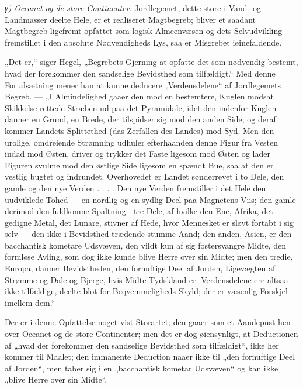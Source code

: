 \documentclass[12pt,a4paper]{book}
\newcommand{\subrunin}[1]{\emph{#1}\hspace{0.4em}}
\begin{document}
\subrunin{γ) Oceanet og de store Continenter.} Jordlegemet, dette store i
Vand- og Landmasser deelte Hele, er et realiseret Magtbegreb; bliver et
saadant Magtbegreb ligefremt opfattet som logisk Almeenvæsen og dets
Selvudvikling fremstillet i den absolute Nødvendigheds Lys, saa er
Misgrebet iøinefaldende.

„Det er,“ siger Hegel, „Begrebets Gjerning at opfatte det som nødvendig
bestemt, hvad der forekommer den sandselige Bevidsthed som tilfældigt.“
Med denne Forudsætning mener han at kunne deducere „Verdensdelene“ af
Jordlegemets Begreb. --- „I Almindelighed gaaer den mod en bestemtere,
Kuglen modsat Skikkelse rettede Stræben ud paa det Pyramidale, idet den
indenfor Kuglen danner en Grund, en Brede, der tilspidser sig mod den
anden Side; og deraf kommer Landets Splittethed (das Zerfallen des Landes)
mod Syd. Men den urolige, omdreiende Strømning udhuler efterhaanden denne
Figur fra Vesten indad mod Østen, driver og trykker det Faste ligesom mod
Østen og lader Figuren svulme mod den østlige Side ligesom en spændt Bue,
saa at den er vestlig bugtet og indrundet. Overhovedet er Landet
sønderrevet i to Dele, den gamle og den nye Verden . . . . Den nye Verden
fremstiller i det Hele den uudviklede Tohed --- en nordlig og en sydlig
Deel paa Magnetens Viis; den gamle derimod den fuldkomne Spaltning i tre
Dele, af hvilke den Ene, Afrika, det gedigne Metal, det Lunare, stivner af
Hede, hvor Mennesket er sløvt fortabt i sig selv --- den ikke i Bevidsthed
trædende stumme Aand; den anden, Asien, er den bacchantisk kometare
Udsvæven, den vildt kun af sig
fostersvangre Midte, den formløse Avling, som dog ikke kunde blive Herre
over sin Midte; men den tredie, Europa, danner Bevidstheden, den
fornuftige Deel af Jorden, Ligevægten af Strømme og Dale og Bjerge, hvis
Midte Tydskland er. Verdensdelene ere altsaa ikke tilfældige, deelte blot
for Beqvemmeligheds Skyld; der er væsenlig Forskjel imellem dem.“

Der er i denne Opfattelse noget vist Storartet; den gaaer som et Aandepust
hen over Oceanet og de store Continenter; men det er dog øiensynligt, at
Deductionen af „hvad der forekommer den sandselige Bevidsthed som
tilfældigt“, ikke her kommer til Maalet; den immanente Deduction naaer
ikke til „den fornuftige Deel af Jorden“, men taber sig i en „bacchantisk
kometar Udsvæven“ og kan ikke „blive Herre over sin Midte“.
\end{document}
